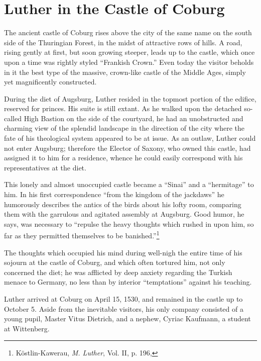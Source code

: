 \section{Luther in the Castle of Coburg}

The ancient castle of Coburg rises above the city of the same name
on the south side of the Thuringian Forest, in the midst of attractive
rows of hills. A road, rising gently at first, but soon growing steeper,
leads up to the castle, which once upon a time was rightly styled
“Frankish Crown.” Even today the visitor beholds in it the best type
of the massive, crown-like castle of the Middle Ages, simply yet magnificently
constructed.

During the diet of Augsburg, Luther resided in the topmost portion
of the edifice, reserved for princes. His suite is still extant. As he
walked upon the detached so-called High Bastion on the side of the
courtyard, he had an unobstructed and charming view of the splendid
landscape in the direction of the city where the fate of his theological
system appeared to be at issue. As an outlaw, Luther could not enter
Augsburg; therefore the Elector of Saxony, who owned this castle,
had assigned it to him for a residence, whence he could easily correspond
with his representatives at the diet.

This lonely and almost unoccupied castle became a “Sinai” and a
“hermitage” to him. In his first correspondence “from the kingdom
of the jackdaws” he humorously describes the antics of the birds about
his lofty room, comparing them with the garrulous and agitated assembly
at Augsburg. Good humor, he says, was necessary to “repulse the heavy
thoughts which rushed in upon him, so far as they
permitted themselves to be banished.”\footnote
{Köstlin-Kawerau, \textit{M. Luther}, Vol. II, p. 196,}

The thoughts which occupied his mind during well-nigh the entire
time of his sojourn at the castle of Coburg, and which often tortured
him, not only concerned the diet; he was afflicted by deep anxiety
regarding the Turkish menace to Germany, no less than by interior
“temptations” against his teaching.

Luther arrived at Coburg on April 15, 1530, and remained in the
castle up to October 5. Aside from the inevitable visitors, his only
company consisted of a young pupil, Master Vitus Dietrich, and a
nephew, Cyriac Kaufmann, a student at Wittenberg.


